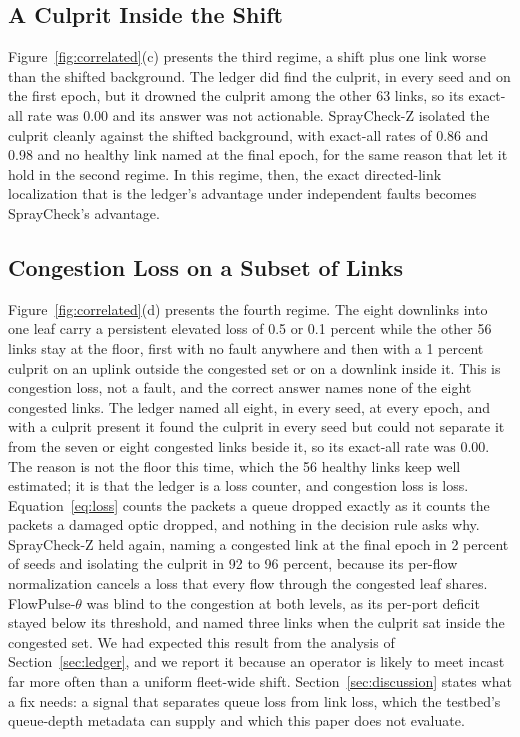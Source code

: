 \subsection{A Culprit Inside the Shift}

Figure~\ref{fig:correlated}(c) presents the third regime, a shift plus one link worse than the shifted background. The ledger did find the culprit, in every seed and on the first epoch, but it drowned the culprit among the other 63 links, so its exact-all rate was 0.00 and its answer was not actionable. SprayCheck-Z isolated the culprit cleanly against the shifted background, with exact-all rates of 0.86 and 0.98 and no healthy link named at the final epoch, for the same reason that let it hold in the second regime. In this regime, then, the exact directed-link localization that is the ledger's advantage under independent faults becomes SprayCheck's advantage.

\subsection{Congestion Loss on a Subset of Links}

Figure~\ref{fig:correlated}(d) presents the fourth regime. The eight downlinks into one leaf carry a persistent elevated loss of 0.5 or 0.1 percent while the other 56 links stay at the floor, first with no fault anywhere and then with a 1 percent culprit on an uplink outside the congested set or on a downlink inside it. This is congestion loss, not a fault, and the correct answer names none of the eight congested links. The ledger named all eight, in every seed, at every epoch, and with a culprit present it found the culprit in every seed but could not separate it from the seven or eight congested links beside it, so its exact-all rate was 0.00. The reason is not the floor this time, which the 56 healthy links keep well estimated; it is that the ledger is a loss counter, and congestion loss is loss. Equation~\eqref{eq:loss} counts the packets a queue dropped exactly as it counts the packets a damaged optic dropped, and nothing in the decision rule asks why. SprayCheck-Z held again, naming a congested link at the final epoch in 2 percent of seeds and isolating the culprit in 92 to 96 percent, because its per-flow normalization cancels a loss that every flow through the congested leaf shares. FlowPulse-$\theta$ was blind to the congestion at both levels, as its per-port deficit stayed below its threshold, and named three links when the culprit sat inside the congested set. We had expected this result from the analysis of Section~\ref{sec:ledger}, and we report it because an operator is likely to meet incast far more often than a uniform fleet-wide shift. Section~\ref{sec:discussion} states what a fix needs: a signal that separates queue loss from link loss, which the testbed's queue-depth metadata can supply and which this paper does not evaluate.

